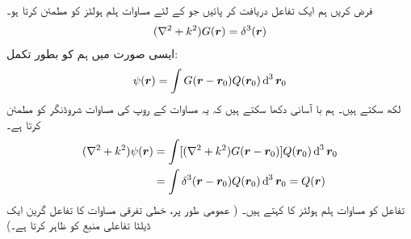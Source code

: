فرض کریں ہم ایک تفاعل  دریافت کر پائیں جو   کے لئے مساوات ہلم ہولٹز کو مطمئن کرتا ہو۔
\begin{align}\label{مساوات_بکھراو_ہلم_ہولٹز_ڈلٹا}
	(\nabla^2+k^2)G({{\boldsymbol{r}}})=\delta^3({{\boldsymbol{r}}})
\end{align}
ایسی صورت میں ہم  کو بطور تکمل:
\begin{align}\label{مساوات_بکھراو_سائے_بطور_تکمل}
	\psi(\kvec{r})=\int G(\kvec{r}-\kvec{r}_0)Q(\kvec{r}_0)\dif^{\,3}\kvec{r}_0
\end{align}
 لکھ سکتے ہیں۔ ہم با آسانی دکھا سکتے ہیں کہ یہ مساوات  کے روپ کی مساوات شروڈنگر کو مطمئن کرتا ہے۔
\begin{align*}
(\nabla^2+k^2)\psi(\kvec{r}) &= \int[(\nabla^2+k^2)G(\kvec{r}-\kvec{r}_0)]Q(\kvec{r}_0)\dif^{\,3}\kvec{r}_0 \\
	&= \int\delta^3(\kvec{r}-\kvec{r}_0)Q(\kvec{r}_0)\dif^{\,3}\kvec{r}_0 = Q(\kvec{r})
\end{align*}
تفاعل  کو مساوات ہلم ہولٹز کا  کہتے ہیں۔ ( عمومی طور پر، خطی تفرقی مساوات کا تفاعل گرین ایک ڈیلٹا تفاعلی منبع کو  ظاہر کرتا ہے۔)


